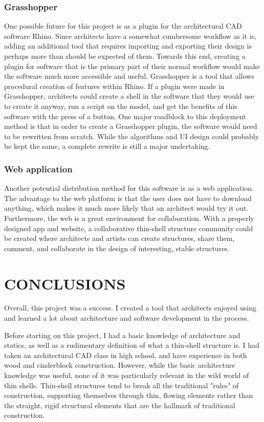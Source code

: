 \documentclass{thesis}
\begin{document}
\subsection{Grasshopper}
One possible future for this project is as a plugin for the architectural CAD software Rhino.  Since architects have a
somewhat cumbersome workflow as it is, adding an additional tool that requires importing and exporting their design is
perhaps more than should be expected of them.  Towards this end, creating a plugin for software that is the primary part
of their normal workflow would make the software much more accessible and useful.  Grasshopper is a tool that allows procedural
creation of features within Rhino.  If a plugin were made in Grasshopper, architects could create a shell in the software that
they would use to create it anyway, run a script on the model, and get the benefits of this software with the press of a
button.  One major roadblock to this deployment method is that in order to create a Grasshopper plugin, the software would
need to be rewritten from scratch.  While the algorithms and UI design could probably be kept the same, a complete rewrite
is still a major undertaking.

\subsection{Web application}
Another potential distribution method for this software is as a web application.  The advantage to the web platform is that the
user does not have to download anything, which makes it much more likely that an architect would try it out.  Furthermore, the
web is a great environment for collaboration.  With a properly designed app and website, a collaborative thin-shell structure
community could be created where architects and artists can create structures, share them, comment, and collaborate in the
design of interesting, stable structures.



\chapter{CONCLUSIONS}
Overall, this project was a success.  I created a tool that architects enjoyed using and learned a lot about architecture and
software development in the process.

Before starting on this project, I had a basic knowledge of architecture and statics, as well as a rudimentary definition of what
a thin-shell structure is.  I had taken an architectural CAD class in high school, and have experience in both wood and cinderblock
construction.  However, while the basic architecture knowledge was useful, none of it was particularly relevant in the wild world
of thin shells.  Thin-shell structures tend to break all the traditional "rules" of construction, supporting themselves through
thin, flowing elements rather than the straight, rigid structural elements that are the hallmark of traditional construction.
\end{document}
